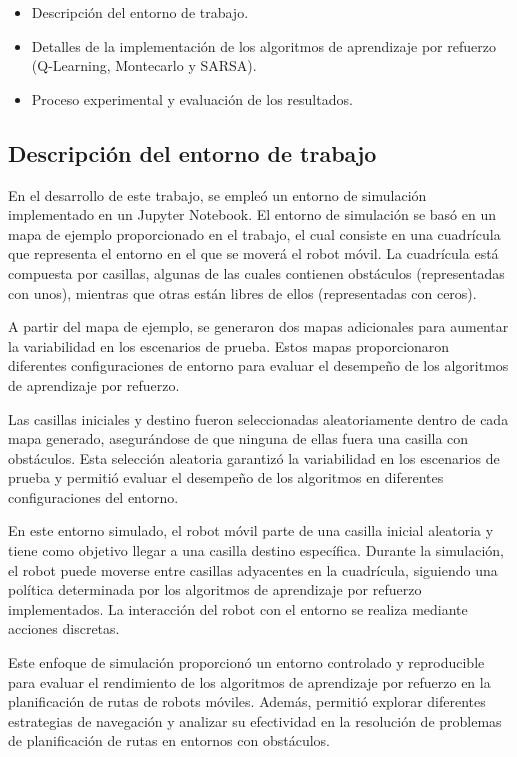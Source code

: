 \documentclass[conference,a4paper]{IEEEtran}
\begin{document}
\begin{itemize}
  \item Descripción del entorno de trabajo.
  \item Detalles de la implementación de los algoritmos de aprendizaje por refuerzo (Q-Learning, Montecarlo y SARSA).
  \item Proceso experimental y evaluación de los resultados.
\end{itemize}

\subsection{Descripción del entorno de trabajo}

En el desarrollo de este trabajo, se empleó un entorno de simulación implementado en un Jupyter Notebook. El entorno de simulación se basó en un mapa de ejemplo proporcionado en el trabajo, el cual consiste en una cuadrícula que representa el entorno en el que se moverá el robot móvil. La cuadrícula está compuesta por casillas, algunas de las cuales contienen obstáculos (representadas con unos), mientras que otras están libres de ellos (representadas con ceros).

A partir del mapa de ejemplo, se generaron dos mapas adicionales para aumentar la variabilidad en los escenarios de prueba. Estos mapas proporcionaron diferentes configuraciones de entorno para evaluar el desempeño de los algoritmos de aprendizaje por refuerzo.

Las casillas iniciales y destino fueron seleccionadas aleatoriamente dentro de cada mapa generado, asegurándose de que ninguna de ellas fuera una casilla con obstáculos. Esta selección aleatoria garantizó la variabilidad en los escenarios de prueba y permitió evaluar el desempeño de los algoritmos en diferentes configuraciones del entorno.

En este entorno simulado, el robot móvil parte de una casilla inicial aleatoria y tiene como objetivo llegar a una casilla destino específica. Durante la simulación, el robot puede moverse entre casillas adyacentes en la cuadrícula, siguiendo una política determinada por los algoritmos de aprendizaje por refuerzo implementados. La interacción del robot con el entorno se realiza mediante acciones discretas.

Este enfoque de simulación proporcionó un entorno controlado y reproducible para evaluar el rendimiento de los algoritmos de aprendizaje por refuerzo en la planificación de rutas de robots móviles. Además, permitió explorar diferentes estrategias de navegación y analizar su efectividad en la resolución de problemas de planificación de rutas en entornos con obstáculos.
\end{document}
